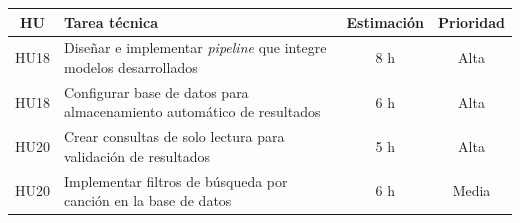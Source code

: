 \documentclass[
11pt, %
]{charter}
\begin{document}
\begin{table}[htpb]
\centering
\begin{tabularx}{\linewidth}{@{}|c|X|c|c|@{}}
\hline
\rowcolor[HTML]{C0C0C0}
HU & Tarea técnica & Estimación & Prioridad \\ \hline

HU18 & Diseñar e implementar \textit{pipeline} que integre modelos desarrollados & 8 h & Alta \\ \hline
HU18 & Configurar base de datos para almacenamiento automático de resultados & 6 h & Alta \\ \hline

HU20 & Crear consultas de solo lectura para validación de resultados & 5 h & Alta \\ \hline
HU20 & Implementar filtros de búsqueda por canción en la base de datos & 6 h & Media \\ \hline
\end{tabularx}
\end{table}



\end{document}
